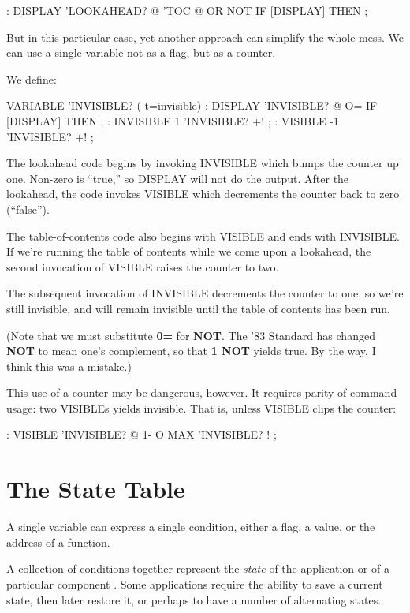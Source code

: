 \begin{Code}
: DISPLAY   'LOOKAHEAD? @  'TOC @ OR  NOT IF [DISPLAY] THEN ;
\end{Code}
But in this particular case, yet another approach can simplify the whole
mess. We can use a single variable not as a flag, but as a counter.

We define:

\begin{Code}
VARIABLE 'INVISIBLE?  ( t=invisible)
: DISPLAY   'INVISIBLE? @  O= IF [DISPLAY] THEN ;
: INVISIBLE   1 'INVISIBLE? +! ;
: VISIBLE    -1 'INVISIBLE? +! ;
\end{Code}
The lookahead code begins by invoking INVISIBLE which bumps the
counter up one. Non-zero is ``true,'' so DISPLAY will not do the output.
After the lookahead, the code invokes VISIBLE which decrements the
counter back to zero (``false'').

The table-of-contents code also begins with VISIBLE and ends with
INVISIBLE. If we're running the table of contents while we come upon a
lookahead, the second invocation of VISIBLE raises the counter to two.

The subsequent invocation of INVISIBLE decrements the counter to
one, so we're still invisible, and will remain invisible until the table of
contents has been run.

(Note that we must substitute \textbf{0=} for \textbf{NOT}. The '83 Standard has
changed \textbf{NOT} to mean one's complement, so that \textbf{1 NOT} yields true. By
the way, I think this was a mistake.)

This use of a counter may be dangerous, however. It requires parity
of command usage: two VISIBLEs yields invisible. That is, unless VISIBLE
clips the counter:

\begin{Code}
: VISIBLE   'INVISIBLE? @  1-  O MAX  'INVISIBLE? ! ;
\end{Code}
\section{The State Table}

A single variable can express a single condition, either a flag, a value, or
the address of a function.

A collection of conditions together represent the \emph{state} of the
application or of a particular component \cite{slater83}. Some applications require the
ability to save a current state, then later restore it, or perhaps to have a
number of alternating states.

